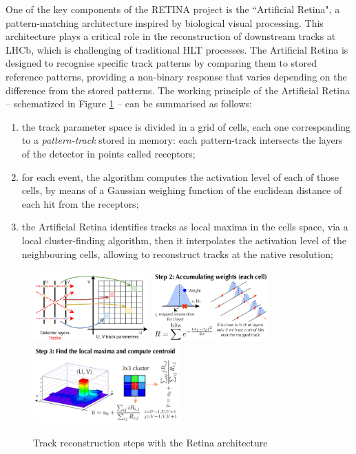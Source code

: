 One of the key components of the RETINA project is the ``Artificial Retina"\cite{Ristori:2000vg}, a pattern-matching architecture inspired by biological visual processing. This architecture plays a critical role in the reconstruction of downstream tracks at LHCb, which is challenging 
of traditional HLT processes. The Artificial Retina is designed to recognise specific track patterns by comparing them to stored reference patterns, providing a non-binary response that varies depending on the difference from the stored patterns. The working principle of the Artificial Retina -- schematized in Figure \ref{fig:retina_algo} -- can be summarised as follows\cite{Ristori:2000vg,Lazzari:2801062, Morello:2888549}:
\begin{enumerate}
\item  the track parameter space is divided in a grid of cells, each one corresponding to a \textit{pattern-track} stored in memory: each pattern-track intersects the layers of the detector in points called receptors;
\item  for each event, the algorithm computes the activation level of each of those cells, by means of a Gaussian weighing function of the euclidean distance of each hit from the receptors;
\item the Artificial Retina identifies tracks as local maxima in the cells space, via a local cluster-finding algorithm, then it interpolates the activation level of the neighbouring cells, allowing to reconstruct tracks at the native resolution;
\end{enumerate}
\begin{figure}
    \centering
    \includegraphics[width=0.4\textwidth]{figures/retina-mapping.png}\hfill
    \includegraphics[width=0.4\textwidth]{figures/retina_algo_step2.png}
    \includegraphics[width=0.5\textwidth]{figures/retina_algo_step3.png}
    \caption{Track reconstruction steps with the Retina architecture}
    \label{fig:retina_algo}
\end{figure}
